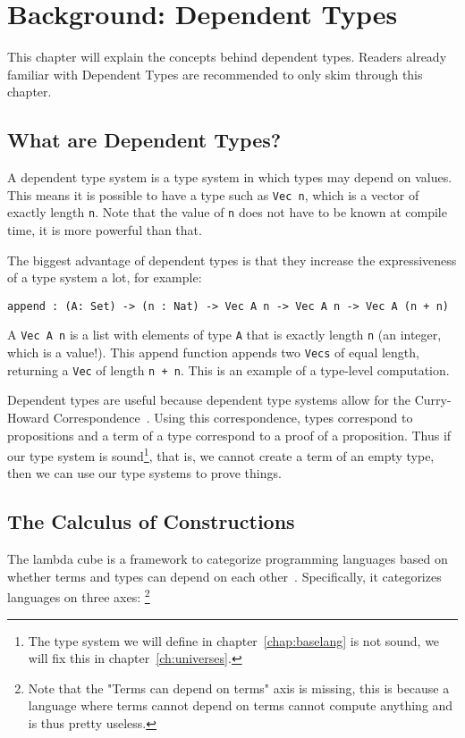 \chapter{\label{chap:bg-dp}Background: Dependent Types}

This chapter will explain the concepts behind dependent types. Readers already familiar with Dependent Types are recommended to only skim through this chapter.

\section{What are Dependent Types?}

A dependent type system is a type system in which types may depend on values. This means it is possible to have a type such as \verb|Vec n|, which is a vector of exactly length \verb|n|. Note that the value of \verb|n| does not have to be known at compile time, it is more powerful than that. 

The biggest advantage of dependent types is that they increase the expressiveness of a type system a lot, for example:
\begin{lstlisting}
append : (A: Set) -> (n : Nat) -> Vec A n -> Vec A n -> Vec A (n + n)
\end{lstlisting}
A \verb|Vec A n| is a list with elements of type \verb|A| that is exactly length \verb|n| (an integer, which is a value!). This append function appends two \verb|Vecs| of equal length, returning a \verb|Vec| of length \verb|n + n|. This is an example of a type-level computation.

Dependent types are useful because dependent type systems allow for the Curry-Howard Correspondence~\cite{chc}. Using this correspondence, types correspond to propositions and a term of a type correspond to a proof of a proposition. Thus if our type system is sound\footnote{The type system we will define in chapter~\ref{chap:baselang} is not sound, we will fix this in chapter~\ref{ch:universes}.}, that is, we cannot create a term of an empty type, then we can use our type systems to prove things.

\section{The Calculus of Constructions}

The lambda cube is a framework to categorize programming languages based on whether terms and types can depend on each other~\cite{lambda_cube}. Specifically, it categorizes languages on three axes: \footnote{Note that the "Terms can depend on terms" axis is missing, this is because a language where terms cannot depend on terms cannot compute anything and is thus pretty useless.}

